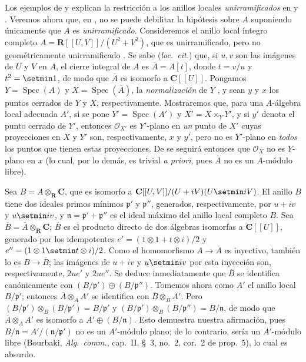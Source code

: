 \begin{env}[11.7.5]
\label{IV.11.7.5}
Los ejemplos de  y  explican la restricción a los anillos locales \emph{unirramificados} en  y .
Veremos ahora que, en , no se puede debilitar la hipótesis sobre $A$ suponiendo únicamente que $A$ es \emph{unirramificado}.
Consideremos el anillo local íntegro completo $A=\mathbf R[[U,V]]/(U^2+V^2)$, que es unirramificado, pero no geométricamente unirramificado .
Se sabe (\emph{loc.\ cit.}) que, si $u,v$ son las imágenes de $U$ y $V$ en $A$, el cierre integral de $A$ es $\overline A=A[t]$, donde $t=v/u$ y $t^2=\setmin 1$, de modo que $\overline A$ es isomorfo a $\mathbf C[[U]]$.
Pongamos $Y=\operatorname{Spec}(A)$ y $X=\operatorname{Spec}(\overline A)$, la \emph{normalización} de $Y$ , y sean $y$ y $x$ los puntos cerrados de $Y$ y $X$, respectivamente.
Mostraremos que, para una $A$-álgebra local adecuada $A'$, si se pone $Y'=\operatorname{Spec}(A')$ y $X'=X\times_Y Y'$, y si $y'$ denota el punto cerrado de $Y'$, entonces $\mathcal O_{X'}$ es $Y'$-plano en \emph{un} punto de $X'$ cuyas proyecciones en $X$ y $Y'$ son, respectivamente, $x$ y $y'$, pero no es $Y'$-plano en \emph{todos} los puntos que tienen estas proyecciones.
De  se seguirá entonces que $\mathcal O_X$ no es $Y$-plano en $x$ (lo cual, por lo demás, es trivial \emph{a priori}, pues $\overline A$ no es un $A$-módulo libre).

Sea $B=A\otimes_{\mathbf R}\mathbf C$, que es isomorfo a $\mathbf C[[U,V]]/(U+iV)(U\setmin iV)$.
El anillo $B$ tiene dos ideales primos mínimos $\mathfrak p'$ y $\mathfrak p''$, generados, respectivamente, por $u+iv$ y $u\setmin iv$, y $\mathfrak n=\mathfrak p'+\mathfrak p''$ es el ideal máximo del anillo local completo $B$.
Sea $\overline B=\overline A\otimes_{\mathbf R}\mathbf C$; $\overline B$ es el producto directo de dos álgebras isomorfas a $\mathbf C[[U]]$, generado por los idempotentes $e'=(1\otimes1+t\otimes i)/2$ y $e''=(1\otimes1\setmin t\otimes i)/2$.
Como el homomorfismo $A\to\overline A$ es inyectivo, también lo es $B\to\overline B$; las imágenes de $u+iv$ y $u\setmin iv$ por esta inyección son, respectivamente, $2ue'$ y $2ue''$.
Se deduce inmediatamente que $\overline B$ se identifica canónicamente con $(B/\mathfrak p')\oplus(B/\mathfrak p'')$.
Tomemos ahora como $A'$ el anillo local $B/\mathfrak p'$; entonces $\overline A\otimes_A A'$ se identifica con $\overline B\otimes_B A'$.
Pero $(B/\mathfrak p')\otimes_B(B/\mathfrak p')=B/\mathfrak p'$ y $(B/\mathfrak p')\otimes_B(B/\mathfrak p'')=B/\mathfrak n$, de modo que $\overline A\otimes_A A'$ es isomorfo a $A'\oplus(B/\mathfrak n)$.
Esto demuestra nuestra afirmación, pues $B/\mathfrak n=A'/(\mathfrak n/\mathfrak p')$ no es un $A'$-módulo plano; de lo contrario, sería un $A'$-módulo libre (Bourbaki, \emph{Alg.\ comm.}, cap.~II, \S~3, no.~2, cor.~2 de prop.~5), lo cual es absurdo.
\end{env}

